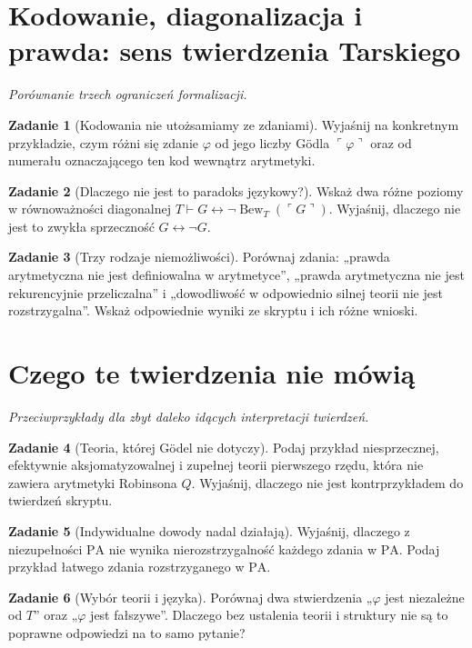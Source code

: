 \documentclass[11pt,a4paper]{article}
\numberwithin{equation}{section}
\newcommand{\Bew}{\operatorname{Bew}}
\theoremstyle{definition}
\newtheorem{zadanie}{Zadanie}[section]
\begin{document}
\section{Kodowanie, diagonalizacja i prawda: sens twierdzenia Tarskiego}

\noindent\textit{Porównanie trzech ograniczeń formalizacji.}


\begin{zadanie}[Kodowania nie utożsamiamy ze zdaniami]
Wyjaśnij na konkretnym przykładzie, czym różni się zdanie $\varphi$ od jego liczby Gödla $\ulcorner\varphi\urcorner$ oraz od numerału oznaczającego ten kod wewnątrz arytmetyki.

\end{zadanie}


\begin{zadanie}[Dlaczego nie jest to paradoks językowy?]
Wskaż dwa różne poziomy w równoważności diagonalnej $T\vdash G\leftrightarrow\neg\Bew_T(\ulcorner G\urcorner)$. Wyjaśnij, dlaczego nie jest to zwykła sprzeczność $G\leftrightarrow\neg G$.

\end{zadanie}


\begin{zadanie}[Trzy rodzaje niemożliwości]
Porównaj zdania: „prawda arytmetyczna nie jest definiowalna w arytmetyce”, „prawda arytmetyczna nie jest rekurencyjnie przeliczalna” i „dowodliwość w odpowiednio silnej teorii nie jest rozstrzygalna”. Wskaż odpowiednie wyniki ze skryptu i ich różne wnioski.

\end{zadanie}


\section{Czego te twierdzenia nie mówią}

\noindent\textit{Przeciwprzykłady dla zbyt daleko idących interpretacji twierdzeń.}


\begin{zadanie}[Teoria, której Gödel nie dotyczy]
Podaj przykład niesprzecznej, efektywnie aksjomatyzowalnej i zupełnej teorii pierwszego rzędu, która nie zawiera arytmetyki Robinsona $Q$. Wyjaśnij, dlaczego nie jest kontrprzykładem do twierdzeń skryptu.

\end{zadanie}


\begin{zadanie}[Indywidualne dowody nadal działają]
Wyjaśnij, dlaczego z niezupełności $\mathrm{PA}$ nie wynika nierozstrzygalność każdego zdania w $\mathrm{PA}$. Podaj przykład łatwego zdania rozstrzyganego w $\mathrm{PA}$.

\end{zadanie}


\begin{zadanie}[Wybór teorii i języka]
Porównaj dwa stwierdzenia „$\varphi$ jest niezależne od $T$” oraz „$\varphi$ jest fałszywe”. Dlaczego bez ustalenia teorii i struktury nie są to poprawne odpowiedzi na to samo pytanie?

\end{zadanie}
\end{document}
